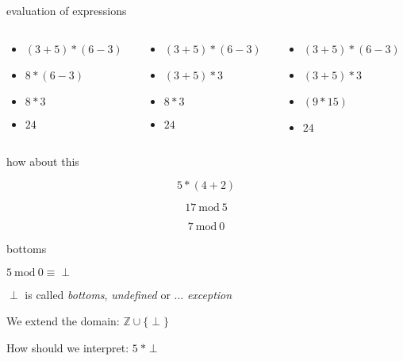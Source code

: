 \begin{frame}{evaluation of expressions}
\begin{columns}
 \begin{column}{0.3\linewidth}
  \begin{itemize}
   \pause \item $(3 + 5) * (6 - 3)$
   \pause \item $8 * (6 - 3)$
   \pause \item $8 * 3$
   \pause \item $24$
  \end{itemize}   
 \end{column}
 \begin{column}{0.3\linewidth}
  \begin{itemize}
   \pause \item $(3 + 5) * (6 - 3)$
   \pause \item $(3 + 5) * 3$
   \pause \item $8 * 3$
   \pause \item $24$
  \end{itemize}   
 \end{column}
 \begin{column}{0.3\linewidth}
  \begin{itemize}
   \pause \item $(3 + 5) * (6 - 3)$
   \pause \item $(3 + 5) * 3$
   \pause \item $(9 * 15)$
   \pause \item $24$
  \end{itemize}   
 \end{column}
 \end{columns}
\end{frame}

\begin{frame}{how about this}

\pause
$$5 * (4+2)$$

\pause
$$17 \ \mathrm{mod}\  5$$

\pause

$$7 \ \mathrm{mod}\  0$$

\end{frame}

\begin{frame}{bottoms}

\pause

\vspace{20pt}\hspace{60pt}$ 5 \ \mathrm{mod}\ 0 \equiv \perp$

\pause

\vspace{20pt}\hspace{60pt}$\perp$ is called {\em bottoms}, {\em undefined} or ... {\em exception}
\pause

\vspace{20pt}\hspace{60pt}We extend the domain: $\mathbb{Z} \cup \{\perp\}$
\pause 

\vspace{20pt}\hspace{60pt}How should we interpret: $5\ * \perp$

\end{frame}

